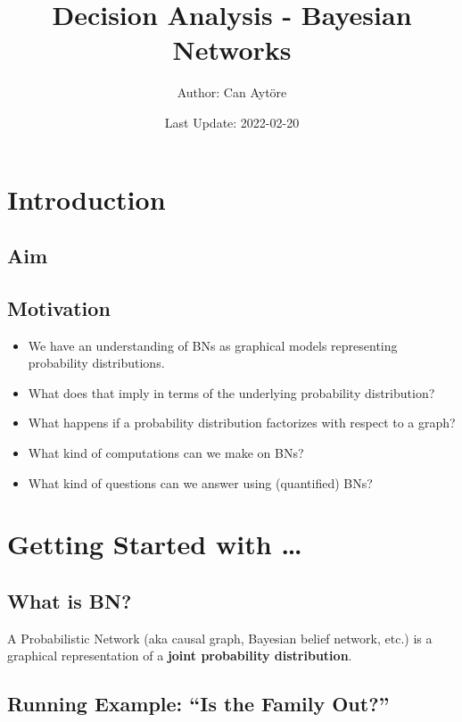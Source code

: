 \documentclass[
]{article}
\title{Decision Analysis - Bayesian Networks}
\author{Author: Can Aytöre}
\date{Last Update: 2022-02-20}
\providecommand{\tightlist}{%
  \setlength{\itemsep}{0pt}\setlength{\parskip}{0pt}}
\begin{document}
\maketitle

{
\setcounter{tocdepth}{2}
\tableofcontents
}
\hypertarget{introduction}{%
\section{Introduction}\label{introduction}}

\hypertarget{aim}{%
\subsection{Aim}\label{aim}}

\hypertarget{motivation}{%
\subsection{Motivation}\label{motivation}}

\begin{itemize}
\tightlist
\item
  We have an understanding of BNs as graphical models representing probability distributions.
\item
  What does that imply in terms of the underlying probability distribution?
\item
  What happens if a probability distribution factorizes with respect to a graph?
\item
  What kind of computations can we make on BNs?
\item
  What kind of questions can we answer using (quantified) BNs?
\end{itemize}

\hypertarget{getting-started-with}{%
\section{Getting Started with \ldots{}}\label{getting-started-with}}

\hypertarget{what-is-bn}{%
\subsection{What is BN?}\label{what-is-bn}}

A Probabilistic Network (aka causal graph, Bayesian belief network, etc.) is a graphical representation of a \textbf{joint probability distribution}.

\hypertarget{running-example-is-the-family-out}{%
\subsection{Running Example: ``Is the Family Out?''}\label{running-example-is-the-family-out}}
\end{document}
